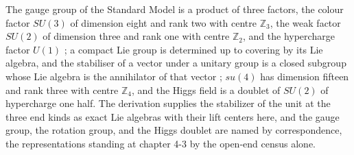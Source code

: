 \begin{chbridge}
The gauge group of the Standard Model is a product of three factors, the colour factor $SU(3)$ of dimension eight and rank two with centre $\mathbb{Z}_3$, the weak factor $SU(2)$ of dimension three and rank one with centre $\mathbb{Z}_2$, and the hypercharge factor $U(1)$ \cite{Weinberg1967,GeorgiGlashow1974}; a compact Lie group is determined up to covering by its Lie algebra, and the stabiliser of a vector under a unitary group is a closed subgroup whose Lie algebra is the annihilator of that vector \cite{Hall2015,Humphreys1972}; $su(4)$ has dimension fifteen and rank three with centre $\mathbb{Z}_4$, and the Higgs field is a doublet of $SU(2)$ of hypercharge one half. The derivation supplies the stabilizer of the unit at the three end kinds as exact Lie algebras with their lift centers here, and the gauge group, the rotation group, and the Higgs doublet are named by correspondence, the representations standing at chapter 4-3 by the open-end census alone.
\end{chbridge}
